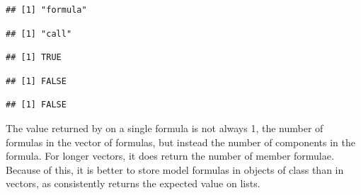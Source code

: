\documentclass[krantz2]{krantz}\usepackage{knitr}
\begin{document}
\begin{explainbox}
\begin{knitrout}\footnotesize
{}\color{fgcolor}\begin{kframe}
\begin{alltt}
 \hlopt{~} \hlstd{)}
\end{alltt}
\begin{verbatim}
## [1] "formula"
\end{verbatim}
\begin{alltt}
 \hlopt{~} \hlstd{)}
\end{alltt}
\begin{verbatim}
## [1] "call"
\end{verbatim}
\begin{alltt}
 \hlopt{~} \hlstd{)}
\end{alltt}
\begin{verbatim}
## [1] TRUE
\end{verbatim}
\begin{alltt}
 \hlopt{~} \hlstd{)}
\end{alltt}
\begin{verbatim}
## [1] FALSE
\end{verbatim}
\begin{alltt}
 \hlopt{~} 
\end{alltt}
\begin{verbatim}
## [1] FALSE
\end{verbatim}
\end{kframe}
\end{knitrout}

The value returned by  on a single formula is not always 1, the number of formulas in the vector of formulas, but instead the number of components in the formula. For longer vectors, it does return the number of member formulae. Because of this, it is better to store model formulas in objects of class  than in vectors, as  consistently returns the expected value on lists.


\end{explainbox}
\end{document}
